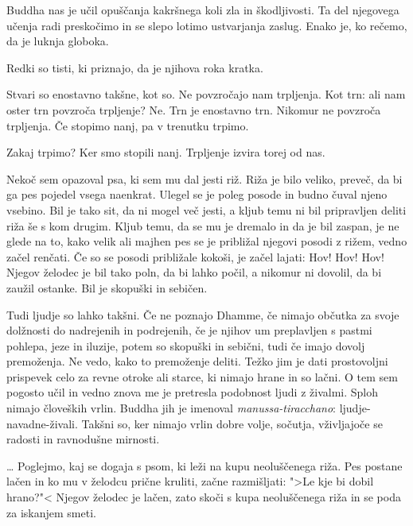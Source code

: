 Buddha nas je učil opuščanja kakršnega koli zla in škodljivosti. Ta del njegovega učenja radi preskočimo in se slepo lotimo ustvarjanja zaslug. Enako je, ko rečemo, da je luknja globoka.

Redki so tisti, ki priznajo, da je njihova roka kratka.


Stvari so enostavno takšne, kot so. Ne povzročajo nam trpljenja. Kot trn: ali nam oster trn povzroča trpljenje? Ne. Trn je enostavno trn. Nikomur ne povzroča trpljenja. Če stopimo nanj, pa v trenutku trpimo.

Zakaj trpimo? Ker smo stopili nanj. Trpljenje izvira torej od nas.

\clearpage


Nekoč sem opazoval psa, ki sem mu dal jesti riž. Riža je bilo veliko, preveč, da bi ga pes pojedel vsega naenkrat. Ulegel se je poleg posode in budno čuval njeno vsebino. Bil je tako sit, da ni mogel več jesti, a kljub temu ni bil pripravljen deliti riža še s kom drugim. Kljub temu, da se mu je dremalo in da je bil zaspan, je ne glede na to, kako velik ali majhen pes se je približal njegovi posodi z rižem, vedno začel renčati. Če so se posodi približale kokoši, je začel lajati: Hov! Hov! Hov! Njegov želodec je bil tako poln, da bi lahko počil, a nikomur ni dovolil, da bi zaužil ostanke. Bil je skopuški in sebičen.

Tudi ljudje so lahko takšni. Če ne poznajo Dhamme, če nimajo občutka za svoje dolžnosti do nadrejenih in podrejenih, če je njihov um preplavljen s pastmi pohlepa, jeze in iluzije, potem so skopuški in sebični, tudi če imajo dovolj premoženja. Ne vedo, kako to premoženje deliti. Težko jim je dati prostovoljni prispevek celo za revne otroke ali starce, ki nimajo hrane in so lačni. O tem sem pogosto učil in vedno znova me je pretresla podobnost ljudi z živalmi. Sploh nimajo človeških vrlin. Buddha jih je imenoval \emph{manussa-tiracchano}: ljudje-navadne-živali. Takšni so, ker nimajo vrlin dobre volje, sočutja, vživljajoče se radosti in ravnodušne mirnosti.

\clearpage


\ldots{} Poglejmo, kaj se dogaja s psom, ki leži na kupu neoluščenega riža. Pes postane lačen in ko mu v želodcu prične kruliti, začne razmišljati: ">Le kje bi dobil hrano?"< Njegov želodec je lačen, zato skoči s kupa neoluščenega riža in se poda za iskanjem smeti.

